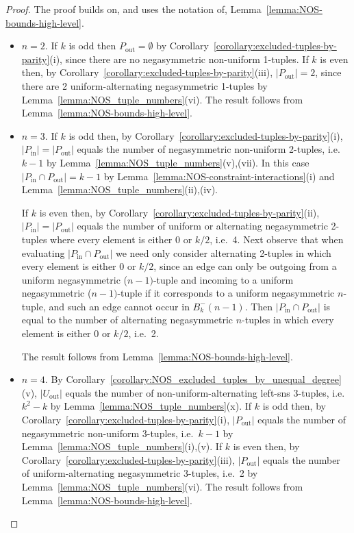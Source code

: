 \documentclass[a4paper,11pt]{article}
\theoremstyle{plain}
\theoremstyle{definition}
\theoremstyle{remark}
\begin{document}
\begin{proof}
The proof builds on, and uses the notation of, Lemma~\ref{lemma:NOS-bounds-high-level}.
\begin{itemize}

\item[i)] {\bf $n=2$}.  If $k$ is odd then $P_{\text{out}}=\emptyset$ by
    Corollary~\ref{corollary:excluded-tuples-by-parity}(i), since there are no negasymmetric
    non-uniform 1-tuples.  If $k$ is even then, by
    Corollary~\ref{corollary:excluded-tuples-by-parity}(iii), $|P_{\text{out}}|=2$, since there
    are 2 uniform-alternating negasymmetric 1-tuples by
    Lemma~\ref{lemma:NOS_tuple_numbers}(vi). The result follows from
    Lemma~\ref{lemma:NOS-bounds-high-level}.


\item[ii)] {\bf $n=3$}.  If $k$ is odd then, by
    Corollary~\ref{corollary:excluded-tuples-by-parity}(i), $|P_{\text{in}}|=|P_{\text{out}}|$
    equals the number of negasymmetric non-uniform 2-tuples, i.e.\ $k-1$ by
    Lemma~\ref{lemma:NOS_tuple_numbers}(v),(vii). In this case $|P_{\text{in}}\cap
    P_{\text{out}}|=k-1$ by Lemma~\ref{lemma:NOS-constraint-interactions}(i) and
    Lemma~\ref{lemma:NOS_tuple_numbers}(ii),(iv).

    If $k$ is even then, by Corollary~\ref{corollary:excluded-tuples-by-parity}(ii),
    $|P_{\text{in}}|=|P_{\text{out}}|$ equals the number of uniform or alternating
    negasymmetric 2-tuples where every element is either 0 or $k/2$, i.e.\ 4. Next observe that
    when evaluating $|P_{\text{in}}\cap P_{\text{out}}|$ we need only consider alternating
    2-tuples in which every element is either 0 or $k/2$, since an edge can only be outgoing
    from a uniform negasymmetric ($n-1)$-tuple and incoming to a uniform negasymmetric
    ($n-1)$-tuple if it corresponds to a uniform negasymmetric $n$-tuple, and such an edge
    cannot occur in $B^-_k(n-1)$.  Then $|P_{\text{in}}\cap P_{\text{out}}|$ is equal to the
    number of alternating negasymmetric $n$-tuples in which every element is either 0 or $k/2$,
    i.e.\ 2.

    The result follows from Lemma~\ref{lemma:NOS-bounds-high-level}.


\item[iii)] {\bf $n=4$}. By Corollary~\ref{corollary:NOS_excluded_tuples_by_unequal_degree}(v),
    $|U_{\text{out}}|$ equals the number of non-uniform-alternating left-sns $3$-tuples, i.e.\
    $k^2-k$ by Lemma~\ref{lemma:NOS_tuple_numbers}(x).  If $k$ is odd then, by
    Corollary~\ref{corollary:excluded-tuples-by-parity}(i), $|P_{\text{out}}|$ equals the
    number of negasymmetric non-uniform 3-tuples, i.e.\ $k-1$ by
    Lemma~\ref{lemma:NOS_tuple_numbers}(i),(v). If $k$ is even then, by
    Corollary~\ref{corollary:excluded-tuples-by-parity}(iii), $|P_{\text{out}}|$ equals the
    number of uniform-alternating negasymmetric 3-tuples, i.e.\ 2 by
    Lemma~\ref{lemma:NOS_tuple_numbers}(vi). The result follows from
    Lemma~\ref{lemma:NOS-bounds-high-level}.



\end{itemize}
\end{proof}
\end{document}
